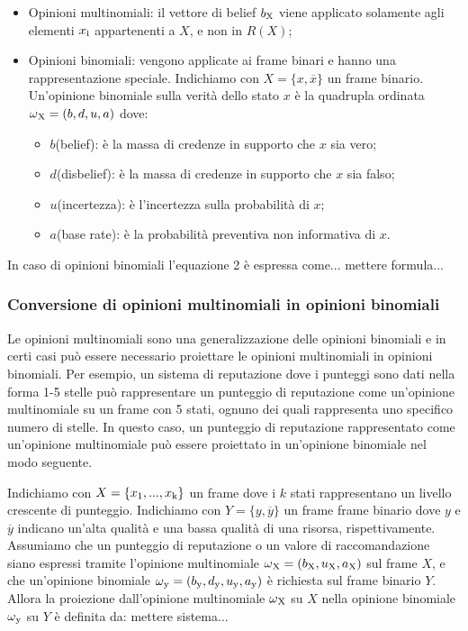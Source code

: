 \documentclass{report}
\begin{document}
	\begin{itemize}
		\item
		Opinioni multinomiali: il vettore di belief $b\textsubscript{X}$ viene
		applicato solamente agli elementi $x\textsubscript{i}$ appartenenti a $X$, e non in $R(X)$;
		\item
		Opinioni binomiali: vengono applicate ai frame binari e hanno una
		rappresentazione speciale. Indichiamo con $X = \{x,\overline{x}\}$ un frame
		binario. Un'opinione binomiale sulla verità dello stato $x$ è la
		quadrupla ordinata $\omega\textsubscript{X}=(b,d,u,a)$ dove:
		
		\begin{itemize}
			\item
			$b$(belief): è la massa di credenze in supporto che $x$ sia vero;
			\item
			$d$(disbelief): è la massa di credenze in supporto che $x$ sia falso;
			\item
			$u$(incertezza): è l'incertezza sulla probabilità di $x$;
			\item
			$a$(base rate): è la probabilità preventiva non informativa di $x$.
		\end{itemize}
	\end{itemize}
	
	In caso di opinioni binomiali l'equazione 2 è espressa come... mettere
	formula...
	
	\hypertarget{header-n89}{%
		\subsubsection{Conversione di opinioni multinomiali in opinioni
			binomiali}\label{header-n89}}
	
	Le opinioni multinomiali sono una generalizzazione delle opinioni
	binomiali e in certi casi può essere necessario proiettare le opinioni
	multinomiali in opinioni binomiali. Per esempio, un sistema di
	reputazione dove i punteggi sono dati nella forma 1-5 stelle può
	rappresentare un punteggio di reputazione come un'opinione multinomiale
	su un frame con 5 stati, ognuno dei quali rappresenta uno specifico
	numero di stelle. In questo caso, un punteggio di reputazione
	rappresentato come un'opinione multinomiale può essere proiettato in
	un'opinione binomiale nel modo seguente.
	
	Indichiamo con $X=\{x\textsubscript{1},...,x\textsubscript{k}\}$ un frame dove i $k$ stati rappresentano un
	livello crescente di punteggio. Indichiamo con $Y=\{y,\overline{y}\}$ un frame
	frame binario dove $y$ e $\overline{y}$ indicano un'alta qualità e una bassa qualità
	di una risorsa, rispettivamente. Assumiamo che un punteggio di
	reputazione o un valore di raccomandazione siano espressi tramite
	l'opinione multinomiale $\omega\textsubscript{X}=(b\textsubscript{X},u\textsubscript{X},a\textsubscript{X})$ sul frame $X$, e che un'opinione
	binomiale $\omega\textsubscript{y}=(b\textsubscript{y},d\textsubscript{y},u\textsubscript{y},a\textsubscript{y})$ è richiesta sul frame binario $Y$. Allora la
	proiezione dall'opinione multinomiale $\omega\textsubscript{X}$ su $X$ nella opinione
	binomiale $\omega\textsubscript{y}$ su $Y$ è definita da: mettere sistema...
	
\end{document}
